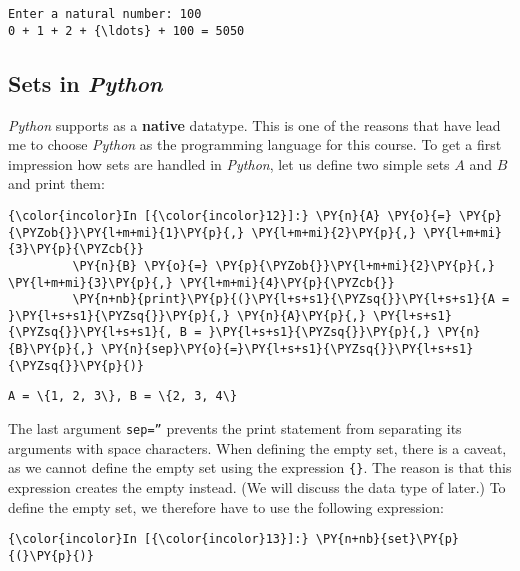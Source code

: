 \begin{Verbatim}[commandchars=\\\{\}]
Enter a natural number: 100
0 + 1 + 2 + {\ldots} + 100 = 5050
\end{Verbatim}

\subsection{\texorpdfstring{Sets in
\textsl{Python}}{Sets in Python}}\label{sets-in-python}
\textsl{Python} supports  as a \textbf{native} datatype. This is one of the reasons that have
lead me to choose \textsl{Python} as the programming language for this
course. To get a first impression how sets are handled in \textsl{Python},
let us define two simple sets \(A\) and \(B\) and print them:

\begin{Verbatim}[commandchars=\\\{\}]
{\color{incolor}In [{\color{incolor}12}]:} \PY{n}{A} \PY{o}{=} \PY{p}{\PYZob{}}\PY{l+m+mi}{1}\PY{p}{,} \PY{l+m+mi}{2}\PY{p}{,} \PY{l+m+mi}{3}\PY{p}{\PYZcb{}}
         \PY{n}{B} \PY{o}{=} \PY{p}{\PYZob{}}\PY{l+m+mi}{2}\PY{p}{,} \PY{l+m+mi}{3}\PY{p}{,} \PY{l+m+mi}{4}\PY{p}{\PYZcb{}}
         \PY{n+nb}{print}\PY{p}{(}\PY{l+s+s1}{\PYZsq{}}\PY{l+s+s1}{A = }\PY{l+s+s1}{\PYZsq{}}\PY{p}{,} \PY{n}{A}\PY{p}{,} \PY{l+s+s1}{\PYZsq{}}\PY{l+s+s1}{, B = }\PY{l+s+s1}{\PYZsq{}}\PY{p}{,} \PY{n}{B}\PY{p}{,} \PY{n}{sep}\PY{o}{=}\PY{l+s+s1}{\PYZsq{}}\PY{l+s+s1}{\PYZsq{}}\PY{p}{)}
\end{Verbatim}


\begin{Verbatim}[commandchars=\\\{\}]
A = \{1, 2, 3\}, B = \{2, 3, 4\}
\end{Verbatim}

The last argument \texttt{sep=''} prevents the print statement from separating its arguments with space characters.
When defining the empty set, there is a caveat, as we cannot define the empty set using the
expression \texttt{\{\}}.  The reason is that this expression creates the empty  instead. (We will
discuss the data type of  later.) To define the empty set, we therefore have
to use the following expression:

\begin{Verbatim}[commandchars=\\\{\}]
{\color{incolor}In [{\color{incolor}13}]:} \PY{n+nb}{set}\PY{p}{(}\PY{p}{)}
\end{Verbatim}


